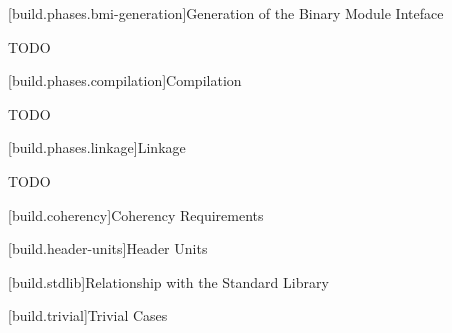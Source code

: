[build.phases.bmi-generation]{Generation of the Binary Module Inteface}

\pnum TODO

[build.phases.compilation]{Compilation}

\pnum TODO

[build.phases.linkage]{Linkage}

\pnum TODO

[build.coherency]{Coherency Requirements}

[build.header-units]{Header Units}

[build.stdlib]{Relationship with the Standard Library}

[build.trivial]{Trivial Cases}

%

